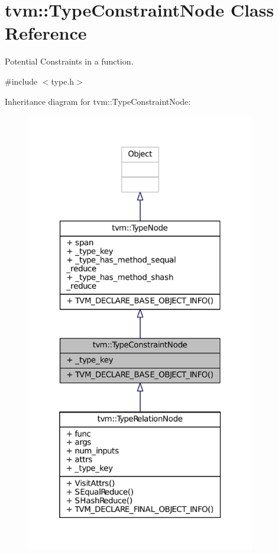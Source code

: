 \hypertarget{classtvm_1_1TypeConstraintNode}{}\section{tvm\+:\+:Type\+Constraint\+Node Class Reference}
\label{classtvm_1_1TypeConstraintNode}


Potential Constraints in a function.  




{\ttfamily \#include $<$type.\+h$>$}



Inheritance diagram for tvm\+:\+:Type\+Constraint\+Node\+:
\nopagebreak
\begin{figure}[H]
\begin{center}
\leavevmode
\includegraphics[height=550pt]{classtvm_1_1TypeConstraintNode__inherit__graph}
\end{center}
\end{figure}


